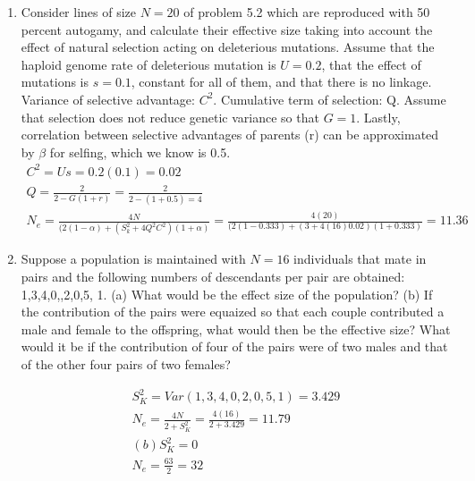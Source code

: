 \documentclass[12pt]{amsart}
\begin{document}
\begin{enumerate}
\item Consider lines of size $N = 20$ of problem 5.2 which are reproduced with 50 percent autogamy, and calculate their effective size taking into account the effect of natural selection acting on deleterious mutations. Assume that the haploid genome rate of deleterious mutation is $U = 0.2$, that the effect of mutations is $s = 0.1$, constant for all of them, and that there is no linkage.\\
Variance of selective advantage: $C^2$. Cumulative term of selection: Q. Assume that selection does not reduce genetic variance so that $G = 1$. Lastly, correlation between selective advantages of parents (r) can be approximated by $\beta$ for selfing, which we know is 0.5.
\begin{gather*}
C^2 = Us = 0.2(0.1) = 0.02\\
Q = \frac{2}{2 - G(1+r)} = \frac{2}{2 - (1+0.5) = 4}\\
N_e = \frac{4N}{(2(1-\alpha) + (S_k^2 + 4Q^2C^2)(1+\alpha)} = \frac{4(20)}{(2(1-0.333) + (3 + 4(16)0.02)(1+0.333)} = 11.36 
\end{gather*}

\item Suppose a population is maintained with $N=16$ individuals that mate in pairs and the following numbers of descendants per pair are obtained: 1,3,4,0,,2,0,5, 1. (a) What would be the effect size of the population? (b) If the contribution of the pairs were equaized so that each couple contributed a male and female to the offspring, what would then be the effective size? What would it be if the contribution of four of the pairs were of two males and that of the other four pairs of two females?

\begin{gather*}
S_K^2 = Var(1,3,4,0,2,0,5,1) = 3.429\\
N_e = \frac{4N}{2 + S_K^2} = \frac{4(16)}{2 + 3.429} = 11.79\\
(b) S_K^2 = 0\\
N_e = \frac{63}{2} = 32
\end{gather*}

\end{enumerate}
\end{document}
